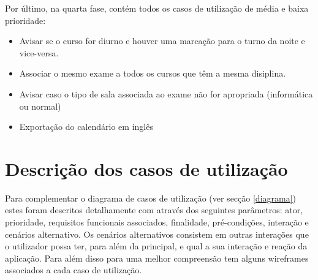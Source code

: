 \documentclass[11pt, twoside]{report}
\begin{document}
	Por último, na quarta fase, contém todos os casos de utilização de média e baixa prioridade:
	\begin{itemize}
		\item Avisar se o curso for diurno e houver uma marcação para o turno da noite e vice-versa.
		\item Associar o mesmo exame a todos os cursos que têm a mesma disiplina.
		\item Avisar caso o tipo de sala associada ao exame não for apropriada (informática ou normal)
		\item Exportação do calendário em inglês
	\end{itemize}
	
	
	\section{Descrição dos casos de utilização}
	\label{descricaousecase}
	
	Para complementar o diagrama de casos de utilização (ver secção \ref{diagrama}) estes foram descritos detalhamente com através dos seguintes parâmetros: ator, prioridade, requisitos funcionais associados, finalidade, pré-condições, interação e cenários alternativo. Os cenários alternativos consistem em outras interações que o utilizador possa ter, para além da principal, e qual a sua interação e reação da aplicação. Para além disso para uma melhor compreensão tem alguns wireframes associados a cada caso de utilização.
	
\end{document}
